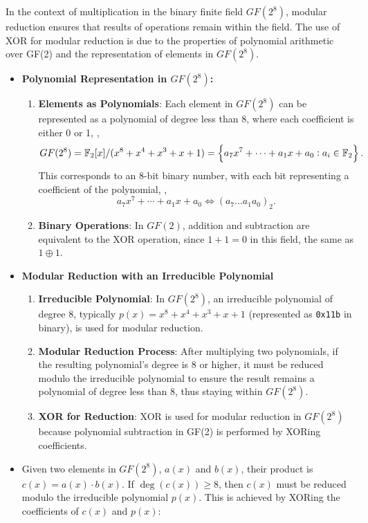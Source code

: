\begin{itemize}
	\newpage
	
	\newpage
	\begin{note}	
	In the context of multiplication in the binary finite field $GF(2^8)$, modular reduction ensures that results of operations remain within the field. The use of XOR for modular reduction is due to the properties of polynomial arithmetic over GF(2) and the representation of elements in $GF(2^8)$.
	\begin{itemize}
		\item \textbf{Polynomial Representation in $GF(2^8)$:}
		\begin{enumerate}
			\item \textbf{Elements as Polynomials}: Each element in $GF(2^8)$ can be represented as a polynomial of degree less than 8, where each coefficient is either 0 or 1, \ie, \[
			GF(2^8)=\mathbb{F}_2[x]/(x^8+x^4+x^3+x+1)=\set{a_7x^7+\cdots+a_1x+a_0:a_i\in\mathbb{F}_2}.
			\] This corresponds to an 8-bit binary number, with each bit representing a coefficient of the polynomial, \ie, \[
			a_7x^7+\cdots+a_1x+a_0\iff(a_7\dots a_1a_0)_2.
			\]
			\item \textbf{Binary Operations}: In $GF(2)$, addition and subtraction are equivalent to the XOR operation, since \(1 + 1 = 0\) in this field, the same as \(1 \oplus 1\).
		\end{enumerate}
		\vspace{12pt}
		\item \textbf{Modular Reduction with an Irreducible Polynomial}
		\begin{enumerate}
			\item \textbf{Irreducible Polynomial}: In $GF(2^8)$, an irreducible polynomial of degree 8, typically \( p(x) = x^8 + x^4 + x^3 + x + 1 \) (represented as \texttt{0x11b} in binary), is used for modular reduction.
			
			\item \textbf{Modular Reduction Process}: After multiplying two polynomials, if the resulting polynomial's degree is 8 or higher, it must be reduced modulo the irreducible polynomial to ensure the result remains a polynomial of degree less than 8, thus staying within $GF(2^8)$.
			
			\item \textbf{XOR for Reduction}: XOR is used for modular reduction in $GF(2^8)$ because polynomial subtraction in GF(2) is performed by XORing coefficients. 
		\end{enumerate}
		\item 
				Given two elements in $GF(2^8)$, \( a(x) \) and \( b(x) \), their product is \( c(x) = a(x) \cdot b(x) \). If \( \deg(c(x)) \geq 8 \), then \( c(x) \) must be reduced modulo the irreducible polynomial \( p(x) \). This is achieved by XORing the coefficients of \( c(x) \) and \( p(x) \):
				

\end{itemize}
\end{note}
\end{itemize}
